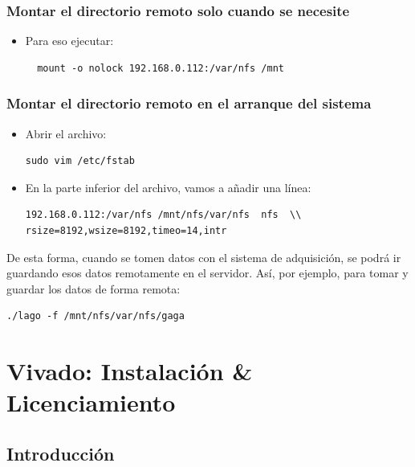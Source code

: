 \documentclass[a4paper,11pt]{article}
\begin{document}
\subsubsection{Montar el directorio remoto solo cuando se necesite}
\begin{itemize}
  \item Para eso ejecutar:
\begin{verbatim}
  mount -o nolock 192.168.0.112:/var/nfs /mnt
\end{verbatim}
\end{itemize}

\subsubsection{Montar el directorio remoto en el arranque del sistema}
\begin{itemize}
  \item Abrir el archivo:
\begin{verbatim}
sudo vim /etc/fstab
\end{verbatim}
\item En la parte inferior del archivo, vamos a añadir una línea:
\begin{verbatim}
192.168.0.112:/var/nfs /mnt/nfs/var/nfs  nfs  \\
rsize=8192,wsize=8192,timeo=14,intr
\end{verbatim}
\end{itemize}

De esta forma, cuando se tomen datos con el sistema de adquisición, se podrá ir
guardando esos datos remotamente en el servidor.
Así, por ejemplo, para tomar y guardar los datos de forma remota:
\begin{verbatim}
./lago -f /mnt/nfs/var/nfs/gaga
\end{verbatim}

\section{Vivado: Instalación \& Licenciamiento}
\subsection{Introducción}
\end{document}
